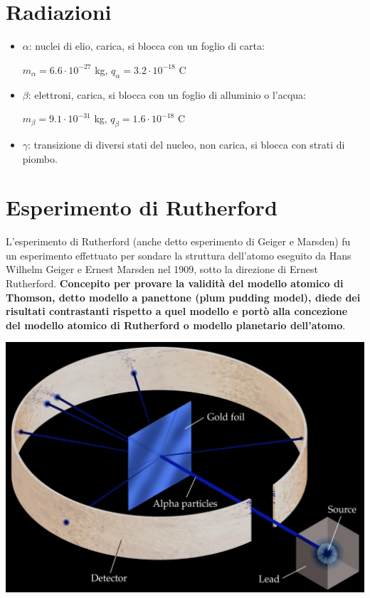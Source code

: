 \documentclass[a4paper,11pt,twoside,openany]{book}
\theoremstyle{definition}
\theoremstyle{plain}
\theoremstyle{plain}
\theoremstyle{definition}
\begin{document}
\section{Radiazioni} %
\begin{itemize}
\item $\alpha $: nuclei di elio, carica, si blocca con un foglio di carta: 

$m_\alpha =6.6\cdot 10^{-27}$ kg, $q_\alpha =3.2\cdot 10^{-18}$ C
\item $\beta $: elettroni, carica, si blocca con un foglio di alluminio o l'acqua:

${m_\beta =9.1\cdot 10^{-31}}$ kg, $q_\beta =1.6\cdot 10^{-18}$ C
\item $\gamma $: transizione di diversi stati del nucleo, non carica, si blocca con strati di piombo.
\end{itemize}

\section{Esperimento di Rutherford} %
L'esperimento di Rutherford (anche detto esperimento di Geiger e Marsden) fu un esperimento effettuato per sondare la struttura dell'atomo eseguito da Hans Wilhelm Geiger e Ernest Marsden nel 1909, sotto la direzione di Ernest Rutherford. \textbf{Concepito per provare la validità del modello atomico di Thomson, detto modello a panettone (plum pudding model), diede dei risultati contrastanti rispetto a quel modello e portò alla concezione del modello atomico di Rutherford o modello planetario dell'atomo}.

\begin{center}
\includegraphics[width=\textwidth]{immagini/rutherford.jpg} %
\end{center}
\end{document}

